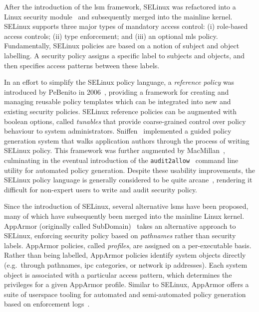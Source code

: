 After the introduction of the \gls{lsm} framework, SELinux was refactored into a Linux
security module~\cite{smalley2001_selinux} and subsequently merged into the mainline
kernel. SELinux supports three major types of mandatory access control: (i) role-based
access controls; (ii) type enforcement; and (iii) an optional \gls{mls} policy.
Fundamentally, SELinux policies are based on a notion of subject and object labelling.
A security policy assigns a specific label to subjects and objects, and then specifies
access patterns between these labels.

In an effort to simplify the SELinux policy language, a \textit{reference policy} was
introduced by PeBenito in 2006~\cite{pebenito2006_refpol}, providing a framework for
creating and managing reusable policy templates which can be integrated into new and
existing security policies. SELinux reference policies can be augmented with boolean
options, called \textit{tunables} that provide coarse-grained control over policy
behaviour to system administrators. Sniffen~\cite{sniffen06_guided} implemented a guided
policy generation system that walks application authors through the process of writing
SELinux policy. This framework was further augmented by
MacMillan~\cite{macmillan07_madison}, culminating in the eventual introduction of the
\texttt{audit2allow}~\cite{audit2allow} command line utility for automated policy
generation. Despite these usability improvements, the SELinux policy language is generally
considered to be quite arcane~\cite{schreuders2012_towards}, rendering it difficult for
non-expert users to write and audit security policy.

Since the introduction of SELinux, several alternative \gls{lsm}s have been proposed, many
of which have subsequently been merged into the mainline Linux kernel. AppArmor
(originally called SubDomain)~\cite{cowan2000_apparmor} takes an alternative approach to
SELinux, enforcing security policy based on \textit{pathnames} rather than security
labels.  AppArmor policies, called \textit{profiles}, are assigned on a per-executable
basis. Rather than being labelled, AppArmor policies identify system objects directly
(e.g.~through pathnames, \gls{ipc} categories, or network \gls{ip} addresses). Each system
object is associated with a particular access pattern, which determines the privileges for
a given AppArmor profile. Similar to SELinux, AppArmor offers a suite of userspace tooling
for automated and semi-automated policy generation based on enforcement
logs~\cite{aa_easyprof, aa_genprof, aa_logprof}.

